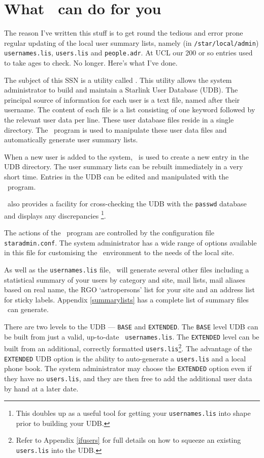 \newpage

\section{What \staradmin\ can do for you}

The reason I've written this stuff is to get round the tedious and
error prone regular updating of the local user summary lists, namely
(in  {\tt /star/local/admin}) {\tt usernames.lis}, {\tt users.lis} and
{\tt people.adr}.  At UCL our 200 or so entries used to take ages to
check. No longer. Here's what I've done.

The subject of this SSN is a utility called \staradmin. This utility
allows the system administrator to build and maintain a Starlink User
Database (UDB). The principal source of information for each user is a
text file, named after their username. The content of each file is a
list consisting of one keyword followed by the relevant user data per
line. These user database files reside in a single directory. The
\staradmin\ program is used to manipulate these user data files and
automatically generate user summary lists.

When a new user is added to the system, \staradmin\ is used to create a
new entry in the UDB directory. The user summary lists can be rebuilt
immediately in a very short time. Entries in the UDB can be edited and
manipulated with the \staradmin\ program.

\staradmin\ also provides a facility for cross-checking the UDB with the
{\tt passwd} database and displays any discrepancies \footnote{This
doubles up as a useful tool for getting your {\tt usernames.lis} into
shape prior to building your UDB.}.

The actions of the \staradmin\ program are controlled by the configuration
file {\tt staradmin.conf}. The system administrator has a wide range of
options available in this file for customising the \staradmin\ environment
to the needs of the local site.

As well as the {\tt usernames.lis} file, \staradmin\ will generate several
other files including a statistical summary of your users by category and
site, mail lists, mail aliases based on real name, the RGO `astropersons'
list for your site and an address list for sticky labels. Appendix
\ref{summarylists} has a complete list of summary files \staradmin\ can
generate.

There are two levels to the UDB --- {\tt BASE} and {\tt EXTENDED}. The
{\tt BASE} level UDB can be built from just a valid, up-to-date {\tt
usernames.lis}.  The {\tt EXTENDED} level can be built from an additional,
correctly formatted {\tt users.lis}\footnote{Refer to Appendix
\ref{ifusers} for full details on how to squeeze an existing {\tt
users.lis} into the UDB.}. The advantage of the {\tt EXTENDED} UDB option
is the ability to auto-generate a {\tt users.lis} and a local phone book.
The system administrator may choose the {\tt EXTENDED} option even if they
have no {\tt users.lis}, and they are then free to add the additional user
data by hand at a later date.


